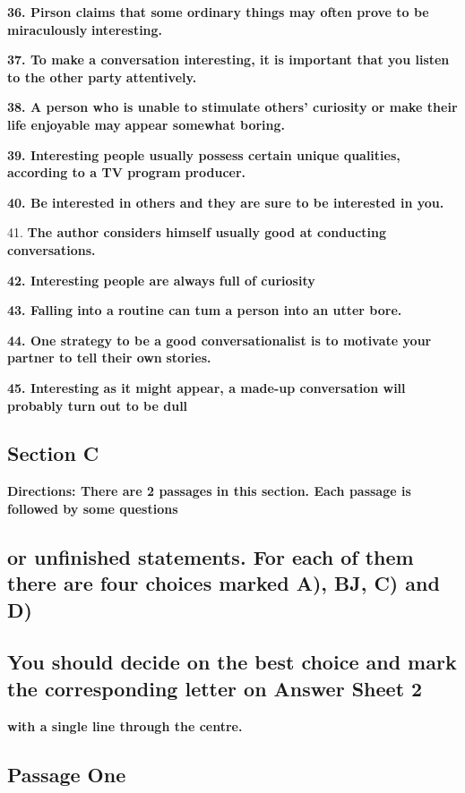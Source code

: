 \documentclass[UTF8,11pt]{ctexart}
\begin{document}
\textbf{36. Pirson claims that some ordinary things may often prove to be miraculously} \textbf{interesting.}


\textbf{37. To make a conversation interesting, it is important that you listen to the other party} \textbf{attentively.}


\textbf{38. A person who is unable to stimulate others' curiosity or make their life enjoyable may} \textbf{appear somewhat boring.}


\textbf{39. Interesting people usually possess certain unique qualities, according to a TV program} \textbf{producer.}


\textbf{40. Be interested in others and they are sure to be interested in you.}


41.\textbf{ The author considers himself usually good at conducting conversations.}


\textbf{42. Interesting people are always full of curiosity}


\textbf{43. Falling into a routine can tum a person into an utter bore.}


\textbf{44. One strategy to be a good conversationalist is to motivate your partner to tell their own} \textbf{stories.}


\textbf{45. Interesting as it might appear, a made-up conversation will probably turn out to be dull}


\subsection*{\textbf{Section C}}


\textbf{Directions: There are 2 passages in this section. Each passage is followed by some questions}


\subsection*{\textbf{or unfinished statements. For each of them there are four choices marked A), BJ, C) and D)}}


\subsection*{\textbf{You should decide on the best choice and mark the corresponding letter on Answer Sheet 2}}


\textbf{with a single line through the centre.}


\subsection*{\textbf{Passage One}}
\end{document}

